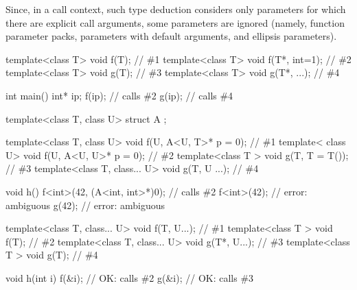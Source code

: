 \pnum
\begin{note}
Since, in a call context, such type deduction considers only parameters
for which there are explicit call arguments, some parameters are ignored (namely,
function parameter packs, parameters with default arguments, and ellipsis
parameters).
\begin{example}
\begin{codeblock}
template<class T> void f(T);                            // \#1
template<class T> void f(T*, int=1);                    // \#2
template<class T> void g(T);                            // \#3
template<class T> void g(T*, ...);                      // \#4

\end{codeblock}
\begin{codeblock}
int main() {
  int* ip;
  f(ip);                                                // calls \#2
  g(ip);                                                // calls \#4
}
\end{codeblock}
\end{example}
\begin{example}
\begin{codeblock}
template<class T, class U> struct A { };

template<class T, class U> void f(U, A<U, T>* p = 0);   // \#1
template<         class U> void f(U, A<U, U>* p = 0);   // \#2
template<class T         > void g(T, T = T());          // \#3
template<class T, class... U> void g(T, U ...);         // \#4

void h() {
  f<int>(42, (A<int, int>*)0);                          // calls \#2
  f<int>(42);                                           // error: ambiguous
  g(42);                                                // error: ambiguous
}
\end{codeblock}
\end{example}
\begin{example}
\begin{codeblock}
template<class T, class... U> void f(T, U...);          // \#1
template<class T            > void f(T);                // \#2
template<class T, class... U> void g(T*, U...);         // \#3
template<class T            > void g(T);                // \#4

void h(int i) {
  f(&i);                                                // OK: calls \#2
  g(&i);                                                // OK: calls \#3
}
\end{codeblock}
\end{example}
\end{note}

